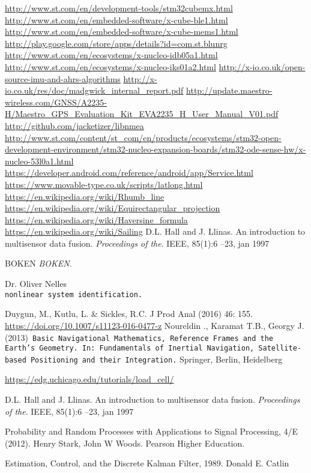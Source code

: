 \begin{thebibliography}{9}
\label{sec:ref}

  \url{http://www.st.com/en/development-tools/stm32cubemx.html}
  \url{http://www.st.com/en/embedded-software/x-cube-ble1.html}
  \url{http://www.st.com/en/embedded-software/x-cube-mems1.html}
  \url{http://play.google.com/store/apps/details?id=com.st.blunrg}
  \url{http://www.st.com/en/ecosystems/x-nucleo-idb05a1.html}
  \url{http://www.st.com/en/ecosystems/x-nucleo-iks01a2.html}
  \url{http://x-io.co.uk/open-source-imu-and-ahrs-algorithms}
  \url{http://x-io.co.uk/res/doc/madgwick_internal_report.pdf}
  \url{http://update.maestro-wireless.com/GNSS/A2235-H/Maestro_GPS_Evaluation_Kit_EVA2235_H_User_Manual_V01.pdf}
  \url{http://github.com/jacketizer/libnmea}
  \url{http://www.st.com/content/st_com/en/products/ecosystems/stm32-open-development-environment/stm32-nucleo-expansion-boards/stm32-ode-sense-hw/x-nucleo-53l0a1.html}
  \url{https://developer.android.com/reference/android/app/Service.html}
  \url{https://www.movable-type.co.uk/scripts/latlong.html}
  \url{https://en.wikipedia.org/wiki/Rhumb_line}
  \url{https://en.wikipedia.org/wiki/Equirectangular_projection}
  \url{https://en.wikipedia.org/wiki/Haversine_formula}
  \url{https://en.wikipedia.org/wiki/Sailing}
D.L. Hall and J. Llinas. An introduction to multisensor data fusion. 
\textit{Proceedings of the}. IEEE, 85(1):6 –23, jan 1997

BOKEN
\textit{BOKEN}. 

 
Dr. Oliver Nelles
\\\texttt{nonlinear system identification.}

Duygun, M., Kutlu, L. \& Sickles, R.C. J Prod Anal (2016) 46: 155. \url{https://doi.org/10.1007/s11123-016-0477-z}
Noureldin ., Karamat T.B., Georgy J. (2013)\texttt{ Basic Navigational Mathematics, Reference Frames and the Earth’s Geometry. In: Fundamentals of Inertial Navigation, Satellite-based Positioning and their Integration.} Springer, Berlin, Heidelberg

  \url{https://edg.uchicago.edu/tutorials/load_cell/}

D.L. Hall and J. Llinas. An introduction to multisensor data fusion. 
\textit{Proceedings of
the}. IEEE, 85(1):6 –23, jan 1997

Probability and Random Processes with Applications to Signal Processing, 4/E (2012). 
Henry Stark, John W Woods. Pearson Higher Education. 

Estimation, Control, and the Discrete Kalman Filter, 1989. Donald E. Catlin


\end{thebibliography}
